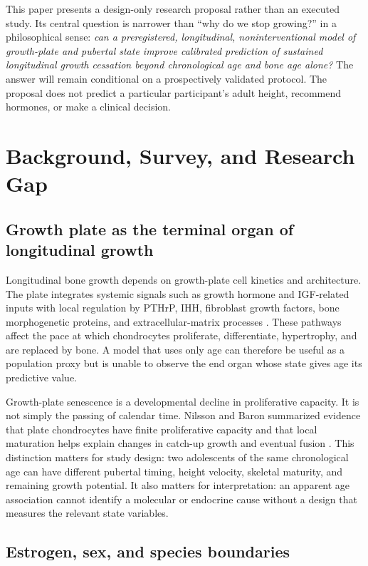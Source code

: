 \documentclass[conference]{IEEEtran}
\begin{document}
This paper presents a design-only research proposal rather than an executed study. Its central question is narrower than ``why do we stop growing?'' in a philosophical sense: \emph{can a preregistered, longitudinal, noninterventional model of growth-plate and pubertal state improve calibrated prediction of sustained longitudinal growth cessation beyond chronological age and bone age alone?} The answer will remain conditional on a prospectively validated protocol. The proposal does not predict a particular participant's adult height, recommend hormones, or make a clinical decision.

\section{Background, Survey, and Research Gap}

\subsection{Growth plate as the terminal organ of longitudinal growth}

Longitudinal bone growth depends on growth-plate cell kinetics and architecture. The plate integrates systemic signals such as growth hormone and IGF-related inputs with local regulation by PTHrP, IHH, fibroblast growth factors, bone morphogenetic proteins, and extracellular-matrix processes \cite{vanderEerden2003,kronenberg2006}. These pathways affect the pace at which chondrocytes proliferate, differentiate, hypertrophy, and are replaced by bone. A model that uses only age can therefore be useful as a population proxy but is unable to observe the end organ whose state gives age its predictive value.

Growth-plate senescence is a developmental decline in proliferative capacity. It is not simply the passing of calendar time. Nilsson and Baron summarized evidence that plate chondrocytes have finite proliferative capacity and that local maturation helps explain changes in catch-up growth and eventual fusion \cite{nilsson2005}. This distinction matters for study design: two adolescents of the same chronological age can have different pubertal timing, height velocity, skeletal maturity, and remaining growth potential. It also matters for interpretation: an apparent age association cannot identify a molecular or endocrine cause without a design that measures the relevant state variables.

\subsection{Estrogen, sex, and species boundaries}
\end{document}
